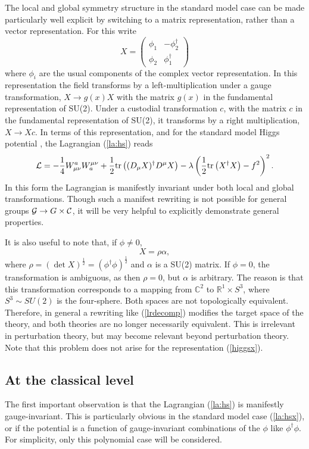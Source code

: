 \documentclass[final,twoside,12pt]{article}
\newcommand*{\La}{{\cal{L}}}
\newcommand*{\no}{\noindent}
\newcommand*{\be}{\begin{equation}}
\newcommand*{\ee}{\end{equation}}
\newcommand*{\pref}[1]{(\ref{#1})}
\newcommand*{\mn}{{\mu\nu}}
\newcommand*{\tr}{\mathrm{tr}}
\newcommand*{\1}{1\!\!\!\bot}
\newcommand*{\bma}{\begin{matrix}}
\newcommand*{\ema}{\end{matrix}}
\newcommand*{\bpm}{\left(\bma}
\newcommand*{\epm}{\ema\right)}
\newcommand*{\rn}{\mathbb{R}}
\newcommand*{\cn}{\mathbb{C}}
\begin{document}
The local and global symmetry structure in the standard model case can be made particularly well explicit by switching to a matrix representation, rather than a vector representation. For this write \cite{Shifman:2012zz}
\be
X=\bpm \phi_1 & -\phi_2^\dagger\\ \phi_2 & \phi_1^\dagger \epm\label{higgsx}
\ee
\no where $\phi_i$ are the usual components of the complex vector representation. In this representation the field transforms by a left-multiplication under a gauge transformation, $X\to g(x)X$ with the matrix $g(x)$ in the fundamental representation of SU(2). Under a custodial transformation $c$, with the matrix $c$ in the fundamental representation of SU(2), it transforms by a right multiplication, $X\to X c$. In terms of this representation, and for the standard model Higgs potential \cite{Bohm:2001yx}, the Lagrangian \pref{la:hs} reads \cite{Shifman:2012zz}
\be
\La=-\frac{1}{4}W_\mn^aW^\mn_a+\frac{1}{2}\tr\left((D_\mu X)^\dagger D^\mu X\right)-\lambda\left(\frac{1}{2}\tr\left(X^\dagger X\right)-f^2\right)^2\label{la:hsx}.
\ee
\no In this form the Lagrangian is manifestly invariant under both local and global transformations. Though such a manifest rewriting is not possible for general groups ${\cal G}\to G\times{\cal C}$, it will be very helpful to explicitly demonstrate general properties.

It is also useful to note that, if $\phi\neq 0$,
\be
X=\rho\alpha\label{lrdecomp},
\ee
\no where $\rho=(\det X)^\frac{1}{2}=(\phi^\dagger\phi)^\frac{1}{2}$ and $\alpha$ is a SU(2) matrix. If $\phi=0$, the transformation is ambiguous, as then $\rho=0$, but $\alpha$ is arbitrary. The reason is that this transformation corresponds to a mapping from $\cn^2$ to $\rn^1\times S^3$, where $S^3\sim SU(2)$ is the four-sphere. Both spaces are not topologically equivalent. Therefore, in general a rewriting like \pref{lrdecomp} modifies the target space of the theory, and both theories are no longer necessarily equivalent. This is irrelevant in perturbation theory, but may become relevant beyond perturbation theory. Note that this problem does not arise for the representation \pref{higgsx}.

\subsection{At the classical level}\label{ss:morse}

The first important observation is that the Lagrangian \pref{la:hs} is manifestly gauge-invariant. This is particularly obvious in the standard model case \pref{la:hsx}, or if the potential is a function of gauge-invariant combinations of the $\phi$ like $\phi^\dagger\phi$. For simplicity, only this polynomial case will be considered.
\end{document}
